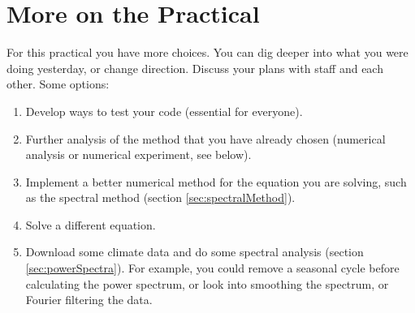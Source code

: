 
\chapter*{More on the Practical}


For this practical you have more choices. You can dig deeper into
what you were doing yesterday, or change direction. Discuss your plans
with staff and each other. Some options:
\begin{enumerate}
\item Develop ways to test your code (essential for everyone).
\item Further analysis of the method that you have already chosen (numerical
analysis or numerical experiment, see below).
\item Implement a better numerical method for the equation you are solving,
such as the spectral method (section \ref{sec:spectralMethod}).
\item Solve a different equation.
\item Download some climate data and do some spectral analysis (section
\ref{sec:powerSpectra}). For example, you could remove a seasonal
cycle before calculating the power spectrum, or look into smoothing
the spectrum, or Fourier filtering the data.
\end{enumerate}

